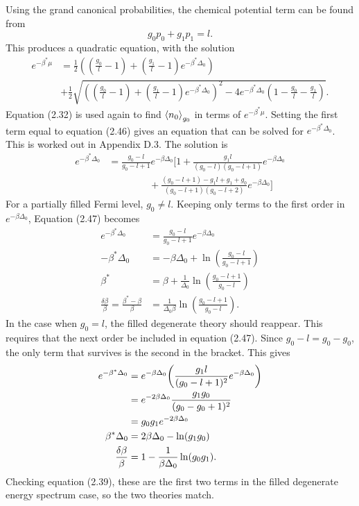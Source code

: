 Using the grand canonical probabilities, the chemical potential term can be found from
\begin{equation}
    g_0 p_0+g_1 p_1=l.
\end{equation}
This produces a quadratic equation, with the solution
\begin{align}
    e^{-\beta^*\mu }&=\frac{1}{2}((\frac{g_0}{l}-1)+(\frac{g_1}{l}-1)e^{-\beta^*\Delta_0})\nonumber\\
    &+\frac{1}{2}\sqrt{((\frac{g_0}{l}-1)+(\frac{g_1}{l}-1)e^{-\beta^*\Delta_0})^2-4e^{-\beta^*\Delta_0}(1-\frac{g_0}{l}-\frac{g_1}{l})}.
\end{align}
Equation (2.32) is used again to find $\left<{n_0}\right>_{g_0}$ in terms of $e^{-\beta^*\mu}$.
Setting the first term equal to equation (2.46) gives an equation that can be solved for $e^{-\beta^*\Delta_0}$. This is worked out in Appendix D.3. The solution is
\begin{align}
    e^{-\beta^*\Delta_0}&=\frac{g_0-l}{g_0-l+1}e^{-\beta\Delta_0} \Biggr[1+\frac{g_1 l}{(g_0-l)(g_0-l+1)}e^{-\beta\Delta_0}\nonumber\\
    &\ \ \ \ \ \ \ \ \ \ \ \ \ \ \ \ \ \ \ +\frac{(g_0-l+1)-g_1l+g_1+g_0}{(g_0-l+1)(g_0-l+2)}e^{-\beta\Delta_0}\Biggr]
\end{align}
For a partially filled Fermi level, $g_0\neq l$. Keeping only terms to the first order in $e^{-\beta\Delta_0}$, Equation (2.47) becomes
\begin{align}
    e^{-\beta^*\Delta_0}&=\frac{g_0-l}{g_0-l+1} e^{-\beta\Delta_0}\nonumber\\
    -\beta^*\Delta_0&=-\beta\Delta_0+\ln(\frac{g_0-l}{g_0-l+1})\nonumber\\
    \beta^*&=\beta+\frac{1}{\Delta_0}\ln(\frac{g_0-l+1}{g_0-l})\nonumber\\
    \frac{\delta\beta}{\beta}=\frac{\beta^*-\beta}{\beta}&=\frac{1}{\Delta_0 \beta}\ln(\frac{g_0-l+1}{g_0-l}).
\end{align}
In the case when $g_0=l$, the filled degenerate theory should reappear. This requires that the next order be included in equation (2.47). Since $g_0-l=g_0-g_0$, the only term that survives is the second in the bracket. This gives
\begin{align}
    e^{-\beta^*\Delta_0}&= e^{-\beta\Delta_0} \qty(\frac{g_1 l}{(g_0-l+1)^2}e^{-\beta\Delta_0})\nonumber\\
    &=e^{-2\beta\Delta_0} \frac{g_1 g_0}{(g_0-g_0+1)^2}\nonumber\\
    &=g_0g_1e^{-2\beta\Delta_0}\nonumber\\
    \beta^*\Delta_0&=2\beta\Delta_0 - \ln(g_1g_0)\nonumber\\
    \frac{\delta\beta}{\beta}&=1-\frac{1}{\beta\Delta_0} \ln(g_0g_1).
\end{align}
Checking equation (2.39), these are the first two terms in the filled degenerate energy spectrum case, so the two theories match. 
